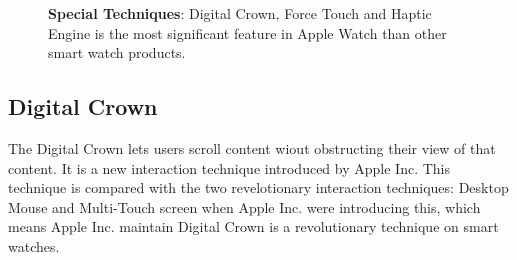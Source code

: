 \begin{figure}[H]
    \kaishu
    \centering
    \caption{\textbf{Special Techniques}: Digital Crown, Force Touch and Haptic Engine is the most significant feature in Apple Watch than other smart watch products.}
    \label{fig:special}
\end{figure}

\subsection{Digital Crown}

The Digital Crown lets users scroll content wiout obstructing their view of that content. It is a new interaction technique introduced by Apple Inc.
This technique is compared with the two revelotionary interaction techniques: Desktop Mouse and Multi-Touch screen when Apple Inc. were introducing this, which means Apple Inc. maintain Digital Crown is a revolutionary technique on smart watches.

